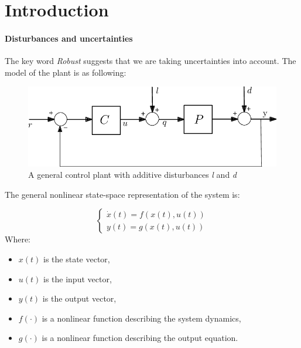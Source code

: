
\chapter{Introduction}    %
\subsubsection{Disturbances and uncertainties}

    The key word \textit{Robust} suggests that we are taking uncertainties into account. The model of the plant is as following:

\begin{figure}[htbp]
    \centering
    \includegraphics[width=\textwidth]{images/1.png} %
    \caption{A general control plant with additive disturbances \textit{l} and \textit{d}}
    \label{fig:graph_label}
\end{figure}


The general nonlinear state-space representation of the system is:

\begin{equation}
    \begin{cases}
    \dot{x}(t) = f(x(t), u(t)) \\
    y(t) = g(x(t), u(t))
    \end{cases}
\end{equation}
Where:
\begin{itemize}
    \item $x(t)$ is the state vector,
    \item $u(t)$ is the input vector,
    \item $y(t)$ is the output vector,
    \item $f(\cdot)$ is a nonlinear function describing the system dynamics,
    \item $g(\cdot)$ is a nonlinear function describing the output equation.\\
\end{itemize}

